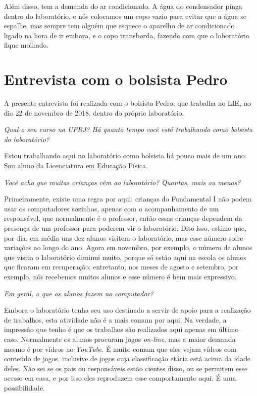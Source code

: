 Além disso, tem a demanda do ar condicionado. A água do condensador pinga dentro do laboratório, e nós colocamos um copo vazio para evitar que a água se espalhe, mas sempre tem alguém que esquece o aparelho de ar condicionado ligado na hora de ir embora, e o copo transborda, fazendo com que o laboratório fique molhado.

\section{Entrevista com o bolsista Pedro}\label{chp:LABEL_CHP_ENT_SEC_PED}

A presente entrevista foi realizada com o bolsista Pedro, que trabalha no LIE, no dia 22 de novembro de 2018, dentro do próprio laboratório.

\textit{Qual o seu curso na UFRJ? Há quanto tempo você está trabalhando como bolsista do laboratório?}

Estou trabalhando aqui no laboratório como bolsista há pouco mais de um ano. Sou aluno da Licenciatura em Educação Física.

\textit{Você acha que muitas crianças vêm ao laboratório? Quantas, mais ou menos?}

Primeiramente, existe uma regra por aqui: crianças do Fundamental I não podem usar os computadores sozinhas, apenas com o acompanhamento de um responsável, que normalmente é o professor, então essas crianças dependem da presença de um professor para poderem vir o laboratório. Dito isso, estimo que, por dia, em média uns dez alunos visitem o laboratório, mas esse número sofre variações ao longo do ano. Agora em novembro, por exemplo, o número de alunos que visita o laboratório diminui muito, porque só estão aqui na escola os alunos que ficaram em recuperação; entretanto, nos meses de agosto e setembro, por exemplo, nós recebemos muitos alunos e esse número é bem mais expressivo.

\textit{Em geral, o que os alunos fazem no computador?}

Embora o laboratório tenha seu uso destinado a servir de apoio para a realização de trabalhos, esta atividade não é a mais comum por aqui. Na verdade, a impressão que tenho é que os trabalhos são realizados aqui apenas em último caso. Normalmente os alunos procuram jogos \textit{on-line}, mas a maior demanda mesmo é por vídeos no \textit{YouTube}. É muito comum que eles vejam vídeos com conteúdo de jogos, inclusive de jogos cuja classificação etária está acima da idade deles. Não sei se os pais ou responsáveis estão cientes disso, ou se permitem esse acesso em casa, e por isso eles reproduzem esse comportamento aqui. É uma possibilidade.

